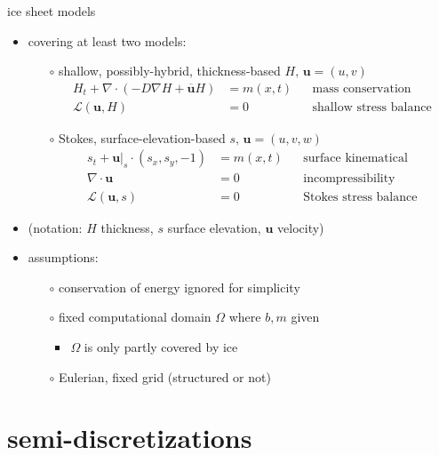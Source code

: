 \documentclass[hide notes,intlimits,usenames,dvipsnames]{beamer}
\newcommand{\Div}{\nabla\cdot}
\newcommand{\grad}{\nabla}
\renewcommand{\bar}{\overline}
\begin{document}
\begin{frame}{ice sheet models}

\begin{itemize}
\item covering at least two models:
    \begin{itemize}
    \item[$\circ$] shallow, possibly-hybrid, thickness-based \hfill {\scriptsize\color{Gray} $H,\, \mathbf{u}=(u,v)$}
        \begin{align*}
        H_t + \Div (-D \grad H + \bar{\mathbf{u}} H) &= m(x,t) && \text{mass conservation} \\
        \mathcal{L}(\mathbf{u},H) &= 0      && \text{shallow stress balance}
        \end{align*}
    \item[$\circ$] Stokes, surface-elevation-based \hfill {\scriptsize\color{Gray} $s,\, \mathbf{u}=(u,v,w)$}
        \begin{align*}
        s_t + \mathbf{u}\big|_s \cdot (s_x,s_y,-1) &= m(x,t) && \text{surface kinematical} \\
        \Div \mathbf{u} &= 0            && \text{incompressibility} \\
        \mathcal{L}(\mathbf{u},s) &= 0  && \text{Stokes stress balance}
        \end{align*}
    \end{itemize}
\item (notation: $H$ thickness, $s$ surface elevation, $\mathbf{u}$ velocity)
\item assumptions:
    \begin{itemize}
    \item[$\circ$] conservation of energy ignored for simplicity
    \item[$\circ$] fixed computational domain $\Omega$ where $b,m$ given
        \begin{itemize}
        \item $\Omega$ is only partly covered by ice
        \end{itemize}
    \item[$\circ$] Eulerian, fixed grid (structured or not)
    \end{itemize}
\end{itemize}
\end{frame}


\section{semi-discretizations}
\end{document}
